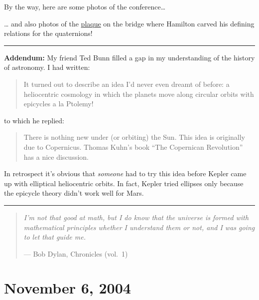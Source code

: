 \documentclass{article}
\def\tightlist{}
\renewcommand{\texttt}[1]{%
  \begingroup
  \ttfamily
  \begingroup\lccode`~=`/\lowercase{\endgroup\def~}{/\discretionary{}{}{}}%
  \begingroup\lccode`~=`[\lowercase{\endgroup\def~}{[\discretionary{}{}{}}%
  \begingroup\lccode`~=`.\lowercase{\endgroup\def~}{.\discretionary{}{}{}}%
  \catcode`/=\active\catcode`[=\active\catcode`.=\active
  \scantokens{#1\noexpand}%
  \endgroup
}
\begin{document}
By the way, here are some photos of the conference\ldots{}


\ldots{} and also photos of the
\href{http://math.ucr.edu/home/baez/dublin/index.html\#hamilton}{plaque}
on the bridge where Hamilton carved his defining relations for the
quaternions!

\begin{center}\rule{0.5\linewidth}{0.5pt}\end{center}

\textbf{Addendum:} My friend Ted Bunn filled a gap in my understanding
of the history of astronomy. I had written:

\begin{quote}
It turned out to describe an idea I'd never even dreamt of before: a
heliocentric cosmology in which the planets move along circular orbits
with epicycles a la Ptolemy!
\end{quote}

to which he replied:

\begin{quote}
There is nothing new under (or orbiting) the Sun. This idea is
originally due to Copernicus. Thomas Kuhn's book ``The Copernican
Revolution'' has a nice discussion.
\end{quote}

In retrospect it's obvious that \emph{someone} had to try this idea
before Kepler came up with elliptical heliocentric orbits. In fact,
Kepler tried ellipses only because the epicycle theory didn't work well
for Mars.

\begin{center}\rule{0.5\linewidth}{0.5pt}\end{center}

\begin{quote}
\emph{I'm not that good at math, but I do know that the universe is
formed with mathematical principles whether I understand them or not,
and I was going to let that guide me.}

--- Bob Dylan, Chronicles (vol.~1)
\end{quote}



\hypertarget{week208}{%
\section{November 6, 2004}\label{week208}}
\end{document}
